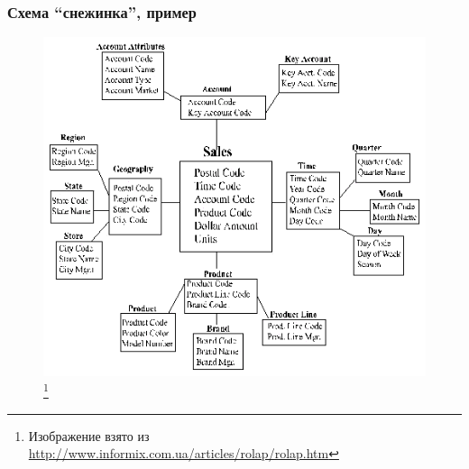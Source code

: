 \documentclass{beamer}
\begin{document}
\begin{frame}
\frametitle{Схема ``снежинка'', пример}

\begin{figure}[htb]
\includegraphics[width=\textwidth,height=0.750\textheight,keepaspectratio]{snowflake.png} 
\footnote{\tiny{Изображение взято из \url{http://www.informix.com.ua/articles/rolap/rolap.htm}}}
 \end{figure}    

\end{frame}
\end{document}
